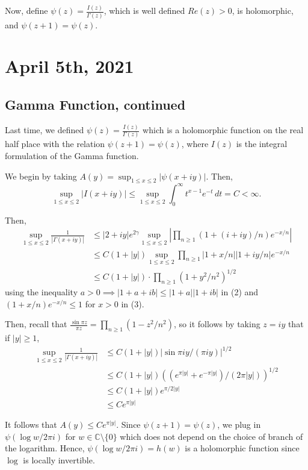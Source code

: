 \documentclass[12pt]{scrartcl}
\newcommand{\C}{\mathbb C}
\begin{document}
 Now, define $\psi(z) = \frac{I(z)}{\Gamma(z)}$, which is well defined $Re(z) > 0$, is holomorphic, and $\psi(z+1) = \psi(z)$. 

\pagebreak
\section{April 5th, 2021}
\subsection{Gamma Function, continued}
Last time, we defined $\psi(z) = \frac{I(z)}{ \Gamma(z)}$ which is a holomorphic function on the real half place with the relation $\psi(z + 1) = \psi(z)$, where $I(z)$ is the integral formulation of the Gamma function.

We begin by taking $A(y) = \sup_{1 \le x \le 2} |\psi(x + iy)|$.  Then,
$$\sup_{1 \le x \le 2} |I(x + iy)| \le \sup_{1 \le x \le 2} \int_0^\infty t^{x-1} e^{-t}\,dt = C < \infty.  $$

Then,
\begin{align}
\sup_{1 \le x \le 2} \frac{1}{|\Gamma(x + iy)|} &\le |2 + iy| e^{2\gamma} \sup_{1 \le x \le 2} |\prod_{n \ge 1} (1 + (i + iy)/n) e^{-x/n}| \\
&\le C(1 + |y|) \sup_{1 \le x \le 2} \prod_{n \ge 1} |1 + x/n| |1 + iy/n| e^{-x/n} \\
&\le C(1 + |y|) \cdot \prod_{n \ge 1} (1 + y^2/n^2)^{1/2} 
\end{align}
using the inequality $a > 0 \implies |1 + a + ib| \le |1 + a| |1 + ib|$ in (2) and $(1 + x/n)e^{-x/n} \le 1$ for $x > 0$ in (3).

Then, recall that $\frac{\sin{\pi z}}{\pi z} = \prod_{n \ge 1} (1 - z^2/n^2)$, so it follows by taking $z = iy$ that if $|y| \ge 1$,
\begin{align*}
\sup_{1 \le x \le 2} \frac{1}{|\Gamma(x + iy)|} &\le C(1 + |y|) |\sin{\pi i y}/(\pi i y)|^{1/2} \\
&\le C(1 + |y|) ((e^{\pi|y|} + e^{-\pi |y|})/(2 \pi |y|))^{1/2} \\
&\le C(1 + |y|) e^{\pi/2 |y|} \\
&\le C e^{\pi |y|}
\end{align*}


It follows that $A(y) \le C e^{\pi |y|}$.  Since $\psi(z+ 1) = \psi(z)$, we plug in $\psi(\log w / 2\pi i)$ for $w \in \C \setminus \{0\}$ which does not depend on the choice of branch of the logarithm.  Hence, $\psi(\log w/2\pi i) = h(w)$ is a holomorphic function since $\log$ is locally invertible.  
\end{document}
